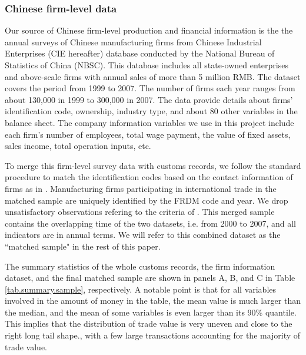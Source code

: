 \documentclass[12pt]{article}
\begin{document}
\subsubsection{Chinese firm-level data} \label{Data-CIE}

Our source of Chinese firm-level production and financial information is the the annual surveys of Chinese manufacturing firms from Chinese Industrial Enterprises (CIE hereafter) database conducted by the National Bureau of Statistics of China (NBSC). This database includes all state-owned enterprises and above-scale firms with annual sales of more than 5 million RMB. The dataset covers the period from 1999 to 2007. The number of firms each year ranges from about 130,000 in 1999 to 300,000 in 2007. The data provide details about firms’ identification code, ownership, industry type, and about 80 other variables in the balance sheet. The company information variables we use in this project include each firm's number of employees, total wage payment, the value of fixed assets, sales income, total operation inputs, etc.

To merge this firm-level survey data with customs records, we follow the standard procedure to match the identification codes based on the contact information of firms as in \cite{fan-li-yeaple2015}. Manufacturing firms participating in international trade in the matched sample are uniquely identified by the FRDM code and year. We drop unsatisfactory observations refering to the criteria of \cite{bkl2021}. This merged sample contains the overlapping time of the two datasets, i.e. from 2000 to 2007, and all indicators are in annual terms. We will refer to this combined dataset as the ``matched sample" in the rest of this paper.

The summary statistics of the whole customs records, the firm information dataset, and the final matched sample are shown in panels A, B, and C in Table \ref{tab.summary.sample}, respectively. A notable point is that for all variables involved in the amount of money in the table, the mean value is much larger than the median, and the mean of some variables is even larger than its 90\% quantile. This implies that the distribution of trade value is very uneven and close to the right long tail shape., with a few large transactions accounting for the majority of trade value.
\end{document}
